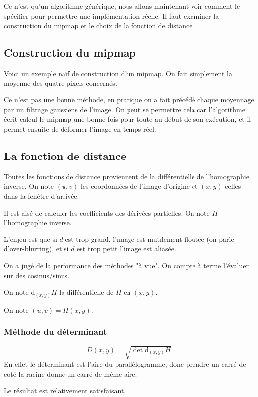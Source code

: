 \documentclass{article}
\newcommand{\sse}[1]{\medbreak \subsection*{#1}}
\newcommand{\ssse}[1]{\subsubsection*{#1}}
\newcommand{\llb}[0]{\llbracket}
\newcommand{\rrb}[0]{\rrbracket}
\newcommand{\dd}[0]{\txt{d}}
\newcommand{\txt}[1]{\textrm{#1}}
\begin{document}
\medbreak
\medbreak
Ce n'est qu'un algorithme générique, nous allons maintenant voir comment le spécifier pour permettre une implémentation réelle. Il faut examiner la construction du mipmap et le choix de la fonction de distance.

\sse{Construction du mipmap}

Voici un exemple naïf de construction d'un mipmap. On fait simplement la moyenne des quatre pixels concernés.
 \medbreak
  \medbreak
 \begin{algorithm}[H]
 \caption{$buildMipMap(*img)$}
 \For{$(i,j)\in \llb1,n\rrb^2$}{
 	$M[1][i][j]=img[i][j]$\;
 }
 \For{$u \in \llb 2,d+1\rrb$}{
 	\For{$(i,j)\in \llb1,\frac{n}{2^{u-1}}\rrb^2$}{
		$M[u][i][j]=\frac{M[u-1][2i][2j][u-1]+M[u-1][2i-1][2j]+M[u-1][2i][2j-1]+M[u-1][2i-1][2j-1]}{4}$\;
	}
 }
 \end{algorithm}
 \medbreak
  \medbreak
 Ce n'est pas une bonne méthode, en pratique on a fait précédé chaque moyennage par un filtrage gaussiens de l'image. On peut se permettre cela car l'algorithme écrit calcul le mipmap une bonne fois pour toute au début de son exécution, et il permet ensuite de déformer l'image en temps réel.  

\sse{La fonction de distance}

Toutes les fonctions de distance proviennent de la différentielle de l'homographie inverse.
On note $(u,v)$ les coordonnées de l'image d'origine et $(x,y)$ celles dans la fenêtre d'arrivée.

Il est aisé de calculer les coefficients des dérivées partielles. On note $H$ l'homographie inverse.


L'enjeu est que si $d$ est trop grand, l'image est inutilement floutée (on parle d'over-blurring), et si $d$ est trop petit l'image est aliasée.

On a jugé de la performance des méthodes "à vue". On compte à terme l'évaluer sur des cosinus/sinus.

On note $\dd_{(x,y)} H$ la différentielle de $H$ en $(x,y)$.

On note $(u,v)=H(x,y)$.

\ssse{Méthode du déterminant}
$$D(x,y) = \sqrt{\det \txt{d}_{(x,y)} H}$$
En effet le déterminant est l'aire du parallélogramme, donc prendre un carré de coté la racine donne un carré de même aire.

Le résultat est relativement satisfaisant.
\end{document}
